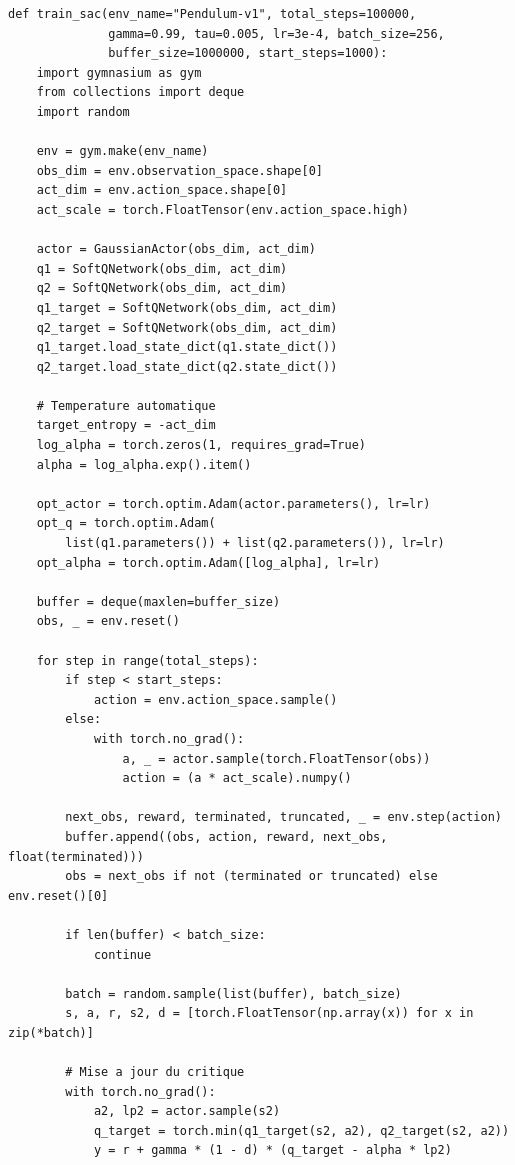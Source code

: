\begin{codeblock}[title=\textbf{SAC --- Entra\^inement}]
\begin{verbatim}
def train_sac(env_name="Pendulum-v1", total_steps=100000,
              gamma=0.99, tau=0.005, lr=3e-4, batch_size=256,
              buffer_size=1000000, start_steps=1000):
    import gymnasium as gym
    from collections import deque
    import random

    env = gym.make(env_name)
    obs_dim = env.observation_space.shape[0]
    act_dim = env.action_space.shape[0]
    act_scale = torch.FloatTensor(env.action_space.high)

    actor = GaussianActor(obs_dim, act_dim)
    q1 = SoftQNetwork(obs_dim, act_dim)
    q2 = SoftQNetwork(obs_dim, act_dim)
    q1_target = SoftQNetwork(obs_dim, act_dim)
    q2_target = SoftQNetwork(obs_dim, act_dim)
    q1_target.load_state_dict(q1.state_dict())
    q2_target.load_state_dict(q2.state_dict())

    # Temperature automatique
    target_entropy = -act_dim
    log_alpha = torch.zeros(1, requires_grad=True)
    alpha = log_alpha.exp().item()

    opt_actor = torch.optim.Adam(actor.parameters(), lr=lr)
    opt_q = torch.optim.Adam(
        list(q1.parameters()) + list(q2.parameters()), lr=lr)
    opt_alpha = torch.optim.Adam([log_alpha], lr=lr)

    buffer = deque(maxlen=buffer_size)
    obs, _ = env.reset()

    for step in range(total_steps):
        if step < start_steps:
            action = env.action_space.sample()
        else:
            with torch.no_grad():
                a, _ = actor.sample(torch.FloatTensor(obs))
                action = (a * act_scale).numpy()

        next_obs, reward, terminated, truncated, _ = env.step(action)
        buffer.append((obs, action, reward, next_obs, float(terminated)))
        obs = next_obs if not (terminated or truncated) else env.reset()[0]

        if len(buffer) < batch_size:
            continue

        batch = random.sample(list(buffer), batch_size)
        s, a, r, s2, d = [torch.FloatTensor(np.array(x)) for x in zip(*batch)]

        # Mise a jour du critique
        with torch.no_grad():
            a2, lp2 = actor.sample(s2)
            q_target = torch.min(q1_target(s2, a2), q2_target(s2, a2))
            y = r + gamma * (1 - d) * (q_target - alpha * lp2)


\end{verbatim}
\end{codeblock}
